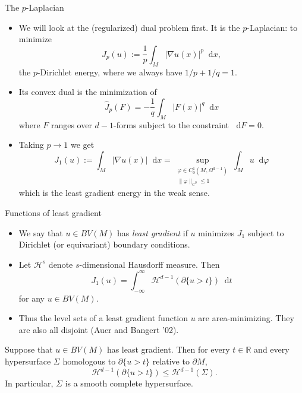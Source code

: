 \documentclass[10pt]{beamer}
\newcommand{\RR}{\mathbb{R}}
\newcommand*\dif{\mathop{}\!\mathrm{d}}
\begin{document}
\begin{frame}{\texorpdfstring{The $p$-Laplacian}{The p-Laplacian}}
\begin{itemize}
\item We will look at the (regularized) dual problem first. It is the $p$-Laplacian: to minimize
$$J_p(u) := \frac{1}{p} \int_M |\nabla u(x)|^p \dif x,$$
the $p$-Dirichlet energy, where we always have $1/p + 1/q = 1$. \pause
\item Its convex dual is the minimization of
$$\hat J_p(F) = -\frac{1}{q} \int_M |F(x)|^q \dif x$$
where $F$ ranges over $d - 1$-forms subject to the constraint $\dif F = 0$. \pause
\item Taking $p \to 1$ we get
$$J_1(u) := \int_M |\nabla u(x)| \dif x = \sup_{\substack{\varphi \in C^1_0(M, \Omega^{d - 1}) \\ \|\varphi\|_{C^0} \leq 1}} \int_M u \dif \varphi$$
which is the least gradient energy in the weak sense.
\end{itemize}
\end{frame}

\begin{frame}{Functions of least gradient}
\begin{itemize}
\item We say that $u \in BV(M)$ has \emph{least gradient} if $u$ minimizes $J_1$ subject to Dirichlet (or equivariant) boundary conditions. \pause
\item Let $\mathcal H^s$ denote $s$-dimensional Hausdorff measure. Then
$$J_1(u) = \int_{-\infty}^\infty \mathcal H^{d - 1}(\partial \{u > t\}) \dif t$$
for any $u \in BV(M)$. \pause
\item Thus the level sets of a least gradient function $u$ are area-minimizing. They are also all disjoint (Auer and Bangert '02). \pause
\end{itemize}

\begin{theorem}
Suppose that $u \in BV(M)$ has least gradient.
Then for every $t \in \RR$ and every hypersurface $\Sigma$ homologous to $\partial \{u > t\}$ relative to $\partial M$,
$$\mathcal H^{d - 1}(\partial \{u > t\}) \leq \mathcal H^{d - 1}(\Sigma).$$
In particular, $\Sigma$ is a smooth complete hypersurface.
\end{theorem} 
\end{frame}
\end{document}

